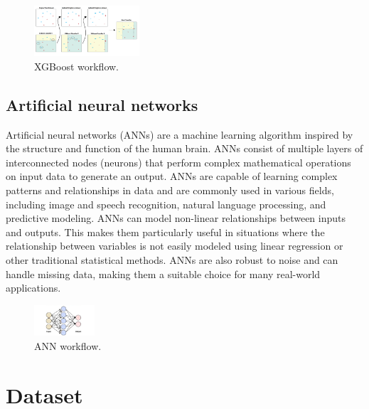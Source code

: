 \documentclass{IEEEtran}
\begin{document}
\

\begin{figure}[h]
\centering
\includegraphics[width=0.35\textwidth]{XG-Boost-FINAL-01.png}
\caption{\label{fig:xgb}XGBoost workflow.}
\end{figure}


\subsection{Artificial neural networks}

Artificial neural networks (ANNs) are a machine learning algorithm inspired by the structure and function of the human brain. ANNs consist of multiple layers of interconnected nodes (neurons) that perform complex mathematical operations on input data to generate an output. ANNs are capable of learning complex patterns and relationships in data and are commonly used in various fields, including image and speech recognition, natural language processing, and predictive modeling. ANNs can model non-linear relationships between inputs and outputs. This makes them particularly useful in situations where the relationship between variables is not easily modeled using linear regression or other traditional statistical methods. ANNs are also robust to noise and can handle missing data, making them a suitable choice for many real-world applications.


\begin{figure}[h]
\centering
\includegraphics[width=0.2\textwidth]{ann.png}
\caption{\label{fig:ann}ANN workflow.}
\end{figure}


\section{Dataset}
\end{document}
